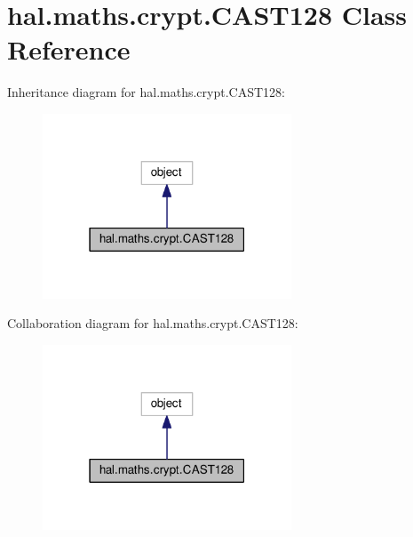 \hypertarget{classhal_1_1maths_1_1crypt_1_1_c_a_s_t128}{}\section{hal.\+maths.\+crypt.\+C\+A\+S\+T128 Class Reference}
\label{classhal_1_1maths_1_1crypt_1_1_c_a_s_t128}


Inheritance diagram for hal.\+maths.\+crypt.\+C\+A\+S\+T128\+:
\nopagebreak
\begin{figure}[H]
\begin{center}
\leavevmode
\includegraphics[width=210pt]{classhal_1_1maths_1_1crypt_1_1_c_a_s_t128__inherit__graph}
\end{center}
\end{figure}


Collaboration diagram for hal.\+maths.\+crypt.\+C\+A\+S\+T128\+:
\nopagebreak
\begin{figure}[H]
\begin{center}
\leavevmode
\includegraphics[width=210pt]{classhal_1_1maths_1_1crypt_1_1_c_a_s_t128__coll__graph}
\end{center}
\end{figure}
